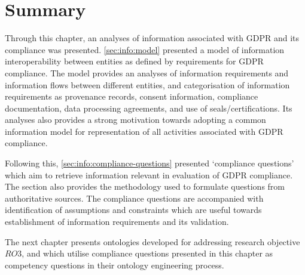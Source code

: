 \section*{Summary}
Through this chapter, an analyses of information associated with GDPR and its compliance was presented. 
\autoref{sec:info:model} presented a model of information interoperability between entities as defined by requirements for GDPR compliance. The model provides an analyses of information requirements and information flows between different entities, and categorisation of information requirements as provenance records, consent information, compliance documentation, data processing agreements, and use of seals/certifications.
Its analyses also provides a strong motivation towards adopting a common information model for representation of all activities associated with GDPR compliance.

Following this, \autoref{sec:info:compliance-questions} presented `compliance questions' which aim to retrieve information relevant in evaluation of GDPR compliance. The section also provides the methodology used to formulate questions from authoritative sources. The compliance questions are accompanied with identification of assumptions and constraints which are useful towards establishment of information requirements and its validation.

The next chapter presents ontologies developed for addressing research objective $RO3$, and which utilise compliance questions presented in this chapter as competency questions in their ontology engineering process.